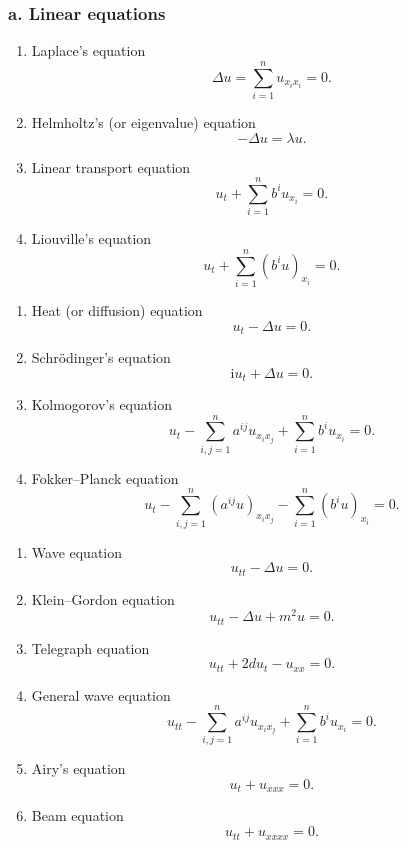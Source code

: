 \subsubsection*{a. Linear equations}
\begin{enumerate}
\item Laplace's equation
\[ \Delta u=\sum_{i=1}^n u_{x_ix_i}=0. \]
\item Helmholtz's (or eigenvalue) equation
\[ -\Delta u=\lambda u. \]
\item Linear transport equation
\[ u_t+\sum_{i=1}^n b^iu_{x_i}=0. \]
\item Liouville's equation
\[ u_t+\sum_{i=1}^n(b^iu)_{x_i}=0. \]
\end{enumerate}
\par\Needspace{65mm}
\begin{enumerate}[resume]
\item Heat (or diffusion) equation
\[ u_t-\Delta u=0. \]
\item Schrödinger's equation
\[ \mathrm i u_t+\Delta u=0. \]
\item Kolmogorov's equation
\[ u_t-\sum_{i,j=1}^n a^{ij}u_{x_ix_j}+\sum_{i=1}^n b^iu_{x_i}=0. \]
\item Fokker--Planck equation
\[ u_t-\sum_{i,j=1}^n(a^{ij}u)_{x_ix_j}-\sum_{i=1}^n(b^iu)_{x_i}=0. \]
\end{enumerate}
\par\Needspace{65mm}
\begin{enumerate}[resume]
\item Wave equation
\[ u_{tt}-\Delta u=0. \]
\item Klein--Gordon equation
\[ u_{tt}-\Delta u+m^2u=0. \]
\item Telegraph equation
\[ u_{tt}+2du_t-u_{xx}=0. \]
\par\Needspace{65mm}
\item General wave equation
\[ u_{tt}-\sum_{i,j=1}^n a^{ij}u_{x_ix_j}+\sum_{i=1}^n b^iu_{x_i}=0. \]
\item Airy's equation
\[ u_t+u_{xxx}=0. \]
\item Beam equation
\[ u_{tt}+u_{xxxx}=0. \]
\end{enumerate}

